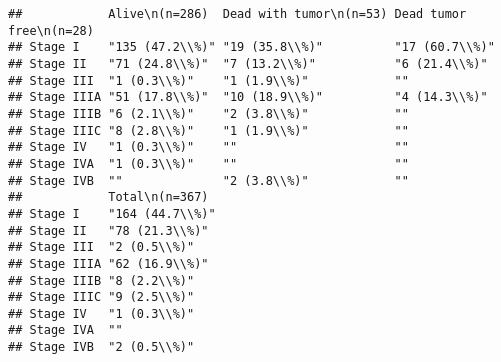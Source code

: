 \documentclass[]{article}
\newenvironment{Shaded}{\begin{snugshade}}{\end{snugshade}}
\newcommand{\KeywordTok}[1]{\textcolor[rgb]{0.13,0.29,0.53}{\textbf{#1}}}
\newcommand{\StringTok}[1]{\textcolor[rgb]{0.31,0.60,0.02}{#1}}
\newcommand{\OperatorTok}[1]{\textcolor[rgb]{0.81,0.36,0.00}{\textbf{#1}}}
\newcommand{\NormalTok}[1]{#1}
\begin{document}
\begin{verbatim}
##            Alive\n(n=286)  Dead with tumor\n(n=53) Dead tumor free\n(n=28)
## Stage I    "135 (47.2\\%)" "19 (35.8\\%)"          "17 (60.7\\%)"         
## Stage II   "71 (24.8\\%)"  "7 (13.2\\%)"           "6 (21.4\\%)"          
## Stage III  "1 (0.3\\%)"    "1 (1.9\\%)"            ""                     
## Stage IIIA "51 (17.8\\%)"  "10 (18.9\\%)"          "4 (14.3\\%)"          
## Stage IIIB "6 (2.1\\%)"    "2 (3.8\\%)"            ""                     
## Stage IIIC "8 (2.8\\%)"    "1 (1.9\\%)"            ""                     
## Stage IV   "1 (0.3\\%)"    ""                      ""                     
## Stage IVA  "1 (0.3\\%)"    ""                      ""                     
## Stage IVB  ""              "2 (3.8\\%)"            ""                     
##            Total\n(n=367) 
## Stage I    "164 (44.7\\%)"
## Stage II   "78 (21.3\\%)" 
## Stage III  "2 (0.5\\%)"   
## Stage IIIA "62 (16.9\\%)" 
## Stage IIIB "8 (2.2\\%)"   
## Stage IIIC "9 (2.5\\%)"   
## Stage IV   "1 (0.3\\%)"   
## Stage IVA  ""             
## Stage IVB  "2 (0.5\\%)"
\end{verbatim}

\begin{Shaded}
\end{Shaded}
\end{document}
